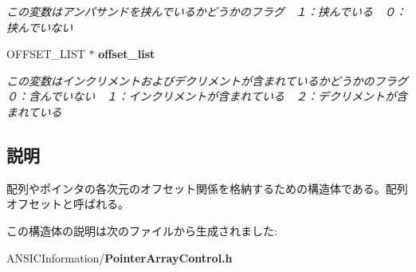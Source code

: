 \begin{DoxyCompactItemize}
\begin{DoxyCompactList}\small\item\em この変数はアンパサンドを挟んでいるかどうかのフラグ　１：挟んでいる　０：挟んでいない \item\end{DoxyCompactList}\item 
OFFSET\_\-LIST $\ast$ {\bf offset\_\-list}\label{structarray__offset_a3b07fc99c154fe2d99d1a31277897c65}

\begin{DoxyCompactList}\small\item\em この変数はインクリメントおよびデクリメントが含まれているかどうかのフラグ　０：含んでいない　１：インクリメントが含まれている　２：デクリメントが含まれている \item\end{DoxyCompactList}\end{DoxyCompactItemize}


\subsection{説明}
配列やポインタの各次元のオフセット関係を格納するための構造体である。配列オフセットと呼ばれる。 

この構造体の説明は次のファイルから生成されました:\begin{DoxyCompactItemize}
\item 
ANSICInformation/{\bf PointerArrayControl.h}\end{DoxyCompactItemize}
